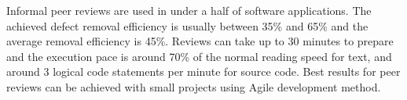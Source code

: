 Informal peer reviews are used in under a half of software applications. The achieved defect removal efficiency is usually between 35\% and 65\% and the average removal efficiency is 45\%. Reviews can take up to 30 minutes to prepare and the execution pace is around 70\% of the normal reading speed for text, and around 3 logical code statements per minute for source code. Best results for peer reviews can be achieved with small projects using Agile development method.